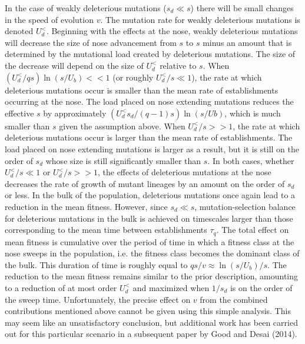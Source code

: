 \documentclass[12pt, one column]{article}
\begin{document}
In the case of weakly deleterious mutations ($s_d \ll s$) there will be small changes in the speed of evolution $v$.  The mutation rate for weakly deleterious mutations is denoted $U_d^{<}$.  Beginning with the effects at the nose, weakly deleterious mutations will decrease the size of nose advancement from $s$ to $s$ minus an amount that is determined by the mutational load created by deleterious mutations.  The size of the decrease will depend on the size of $U_d^{<}$ relative to $s$.  When $(U_d^{<} / qs)\ln(s/U_b) <<1$ (or roughly $U_d^{<}/s \ll 1$), the rate at which deleterious mutations occur is smaller than the mean rate of establishments occurring at the nose.  The load placed on nose extending mutations reduces the effective $s$ by approximately $(U_d^{<} s_d /(q-1)s)\ln(s/Ub)$, which is much smaller than $s$ given the assumption above.  When $U_d^{<} / s >> 1 $, the rate at which deleterious mutations occur is larger than the mean rate of establishments.  The load placed on nose extending mutations is larger as a result, but it is still on the order of $s_d$ whose size is still significantly smaller than $s$.  In both cases, whether $U_d^{<}/s \ll 1$ or $U_d^{<}/s >> 1$, the effects of deleterious mutations at the nose decreases the rate of growth of mutant lineages by an amount on the order of $s_d$ or less.  In the bulk of the population, deleterious mutations once again lead to a reduction in the mean fitness.  However, since $s_d \ll s$, mutation-selection balance for deleterious mutations in the bulk is achieved on timescales larger than those corresponding to the mean time between establishments $\tau_q$.  The total effect on mean fitness is cumulative over the period of time in which a fitness class at the nose sweeps in the population, i.e. the fitness class becomes the dominant class of the bulk.  This duration of time is roughly equal to $qs/v \approx \ln(s/U_b)/s$.  The reduction to the mean fitness remains similar to the prior description, amounting to a reduction of at most order $U_d^{<}$ and maximized when $1/s_d$ is on the order of the sweep time.  Unfortunately, the precise effect on $v$ from the combined contributions mentioned above cannot be given using this simple analysis.  This may seem like an unsatisfactory conclusion, but additional work has been carried out for this particular scenario in a subsequent paper by Good and Desai (2014).
\end{document}
